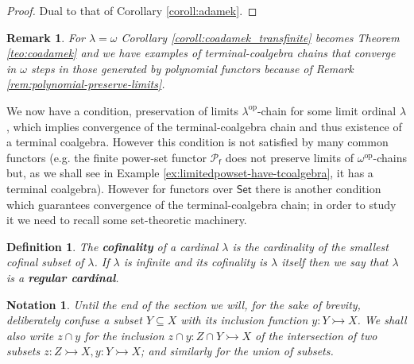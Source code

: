 \documentclass[letterpaper, 11pt, oneside]{memoir}
\theoremstyle{myteo}
\newtheorem{definition}[theorem]{Definition}
\newtheorem{remark}[theorem]{Remark}
\newtheorem{notation}[theorem]{Notation}
\numberwithin{equation}{section}
\newcommand{\marginnote}[1]{\marginpar{\footnotesize #1}}
\newcommand{\Set}{\textsf{Set}}
\newcommand{\op}{\text{op}}
\begin{document}
\begin{proof}
  Dual to that of Corollary \ref{coroll:adamek}.
\end{proof}

\begin{remark}
  For \(\lambda = \omega\) Corollary \ref{coroll:coadamek_transfinite} becomes Theorem \ref{teo:coadamek} and we have examples of terminal-coalgebra chains that converge in \(\omega\) steps in those generated by polynomial functors because of Remark \ref{rem:polynomial-preserve-limits}.
\end{remark}

We now have a condition, preservation of limits \(\lambda^\op\)-chain for some limit ordinal \(\lambda\), which implies convergence of the terminal-coalgebra chain and thus existence of a terminal coalgebra.
However this condition is not satisfied by many common functors (e.g. the finite power-set functor \(\mathcal{P}_\textsf{f}\) does not preserve limits of \(\omega^\op\)-chains but, as we shall see in Example \ref{ex:limitedpowset-have-tcoalgebra}, it has a terminal coalgebra).
However for functors over \(\Set\) there is another condition which guarantees convergence of the terminal-coalgebra chain; in order to study it we need to recall some set-theoretic machinery.

\begin{definition}
  The \textbf{cofinality}\marginnote{cofinality} of a cardinal \(\lambda\) is the cardinality of the smallest cofinal subset of \(\lambda\).
  If \(\lambda\) is infinite and its cofinality is \(\lambda\) itself then we say that \(\lambda\) is a \textbf{regular cardinal}\marginnote{regular cardinal}.
\end{definition}

\begin{notation}
  Until the end of the section we will, for the sake of brevity, deliberately confuse a subset \(Y \subseteq X\) with its inclusion function \(y: Y \rightarrowtail X\).
  We shall also write \(z \cap y\) for the inclusion \(z \cap y : Z \cap Y \rightarrowtail X\) of the intersection of two subsets \(z : Z \rightarrowtail X, y: Y \rightarrowtail X\); and similarly for the union of subsets.
\end{notation}
\end{document}
